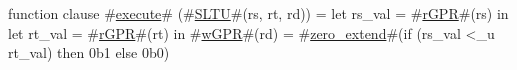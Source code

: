 function clause #\hyperref[zexecute]{execute}# (#\hyperref[zSLTU]{SLTU}#(rs, rt, rd)) =
  {
    let rs_val = #\hyperref[zrGPR]{rGPR}#(rs) in
    let rt_val = #\hyperref[zrGPR]{rGPR}#(rt) in
    #\hyperref[zwGPR]{wGPR}#(rd) = #\hyperref[zzzerozyextend]{zero\_extend}#(if (rs_val <_u rt_val) then 0b1 else 0b0)
  }
